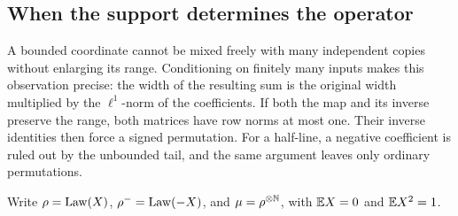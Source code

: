\subsection{When the support determines the operator}

A bounded coordinate cannot be mixed freely with many independent copies
without enlarging its range. Conditioning on finitely many inputs makes
this observation precise: the width of the resulting sum is the original
width multiplied by the \(\ell^1\)-norm of the coefficients. If both the
map and its inverse preserve the range, both matrices have row norms at
most one. Their inverse identities then force a signed permutation.
For a half-line, a negative coefficient is ruled out by the unbounded tail,
and the same argument leaves only ordinary permutations.

Write \(\rho=\operatorname{Law}(X)\), \(\rho^-=\operatorname{Law}(-X)\), and \(\mu=\rho^{\otimes\mathbb N}\),
with \(\mathbb E X=0\) and \(\mathbb E X^2=1\).

